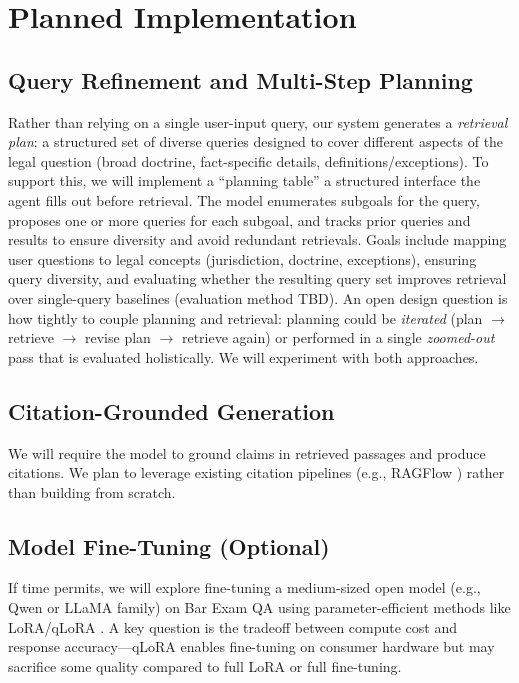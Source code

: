 \documentclass{article}
\begin{document}
\section{Planned Implementation}

\subsection{Query Refinement and Multi-Step Planning}

Rather than relying on a single user-input query, our system generates a \emph{retrieval plan}: a structured set of diverse queries designed to cover different aspects of the legal question (broad doctrine, fact-specific details, definitions/exceptions). To support this, we will implement a ``planning table'' a structured interface the agent fills out before retrieval. The model enumerates subgoals for the query, proposes one or more queries for each subgoal, and tracks prior queries and results to ensure diversity and avoid redundant retrievals. Goals include mapping user questions to legal concepts (jurisdiction, doctrine, exceptions), ensuring query diversity, and evaluating whether the resulting query set improves retrieval over single-query baselines (evaluation method TBD). An open design question is how tightly to couple planning and retrieval: planning could be \emph{iterated} (plan $\rightarrow$ retrieve $\rightarrow$ revise plan $\rightarrow$ retrieve again) or performed in a single \emph{zoomed-out} pass that is evaluated holistically. We will experiment with both approaches.

\subsection{Citation-Grounded Generation}

We will require the model to ground claims in retrieved passages and produce citations. We plan to leverage existing citation pipelines (e.g., RAGFlow \cite{ragflow}) rather than building from scratch.

\subsection{Model Fine-Tuning (Optional)}

If time permits, we will explore fine-tuning a medium-sized open model (e.g., Qwen or LLaMA family) on Bar Exam QA using parameter-efficient methods like LoRA/qLoRA \cite{hu2021lora, dettmers2023qlora}. A key question is the tradeoff between compute cost and response accuracy---qLoRA enables fine-tuning on consumer hardware but may sacrifice some quality compared to full LoRA or full fine-tuning.
\end{document}
